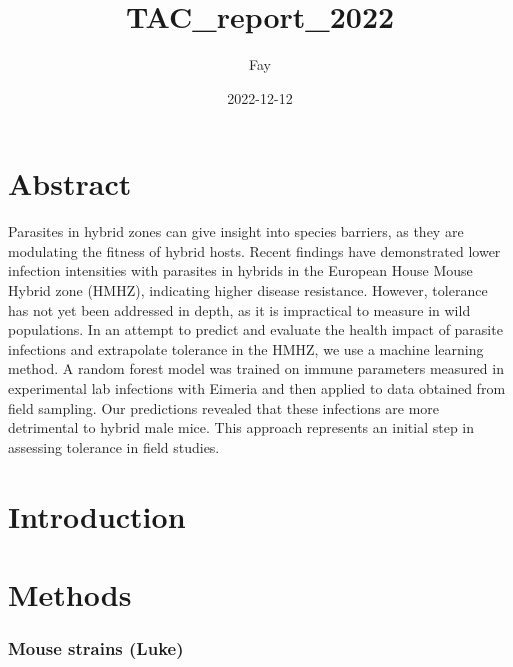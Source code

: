 \documentclass[
]{article}
\title{TAC\_report\_2022}
\author{Fay}
\date{2022-12-12}
\begin{document}
\maketitle

\hypertarget{abstract}{%
\section{Abstract}\label{abstract}}

Parasites in hybrid zones can give insight into species barriers, as
they are modulating the fitness of hybrid hosts. Recent findings have
demonstrated lower infection intensities with parasites in hybrids in
the European House Mouse Hybrid zone (HMHZ), indicating higher disease
resistance. However, tolerance has not yet been addressed in depth, as
it is impractical to measure in wild populations. In an attempt to
predict and evaluate the health impact of parasite infections and
extrapolate tolerance in the HMHZ, we use a machine learning method. A
random forest model was trained on immune parameters measured in
experimental lab infections with Eimeria and then applied to data
obtained from field sampling. Our predictions revealed that these
infections are more detrimental to hybrid male mice. This approach
represents an initial step in assessing tolerance in field studies.

\hypertarget{introduction}{%
\section{Introduction}\label{introduction}}

\hypertarget{methods}{%
\section{Methods}\label{methods}}

\hypertarget{mouse-strains-luke}{%
\subsubsection{Mouse strains (Luke)}\label{mouse-strains-luke}}
\end{document}
